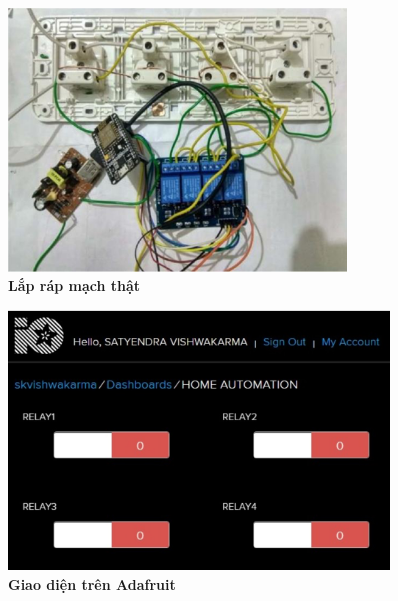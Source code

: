 \documentclass[11pt]{beamer}
\renewcommand{\label}[1]{%
			\gdef\sfname{sf:##1}}%
\begin{document}
\begin{frame}[c]{}
		
	\begin{figure}[h]
		\includegraphics[width=0.8\textwidth]{Image/Fig. 4 Circuit.png}
		\caption{\centering \textbf{Lắp ráp mạch thật}}
	\end{figure}			
	
\end{frame}


\begin{frame}[c]{}
		
	\begin{figure}[h]
		\includegraphics[width=0.9\textwidth]{Image/Fig. 5 Adafruit UI.png}
		\caption{\centering \textbf{Giao diện trên Adafruit}}
	\end{figure}			
	
\end{frame}
\end{document}
